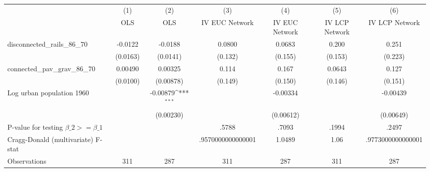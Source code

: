 {
\def\sym#1{\ifmmode^{#1}\else\(^{#1}\)\fi}
\begin{tabular}{l*{6}{c}}
\hline\hline
                &\multicolumn{1}{c}{(1)}&\multicolumn{1}{c}{(2)}&\multicolumn{1}{c}{(3)}&\multicolumn{1}{c}{(4)}&\multicolumn{1}{c}{(5)}&\multicolumn{1}{c}{(6)}\\
                &\multicolumn{1}{c}{OLS}&\multicolumn{1}{c}{OLS}&\multicolumn{1}{c}{IV EUC Network}&\multicolumn{1}{c}{IV EUC Network}&\multicolumn{1}{c}{IV LCP Network}&\multicolumn{1}{c}{IV LCP Network}\\
\hline
disconnected\_rails\_86\_70&  -0.0122         &  -0.0188         &   0.0800         &   0.0683         &    0.200         &    0.251         \\
                & (0.0163)         & (0.0141)         &  (0.132)         &  (0.155)         &  (0.153)         &  (0.223)         \\
[1em]
connected\_pav\_grav\_86\_70&  0.00490         &  0.00325         &    0.114         &    0.167         &   0.0643         &    0.127         \\
                & (0.0100)         &(0.00878)         &  (0.149)         &  (0.150)         &  (0.146)         &  (0.151)         \\
[1em]
Log urban population 1960&                  & -0.00879\sym{***}&                  & -0.00334         &                  & -0.00439         \\
                &                  &(0.00230)         &                  &(0.00612)         &                  &(0.00649)         \\
\hline
P-value for testing $\beta\_{2} >= \beta\_{1}$&                  &                  &    .5788         &    .7093         &    .1994         &    .2497         \\
Cragg-Donald (multivariate) F-stat&                  &                  &.9570000000000001         &   1.0489         &     1.06         &.9773000000000001         \\
Observations    &      311         &      287         &      311         &      287         &      311         &      287         \\
\hline\hline
\end{tabular}
}
